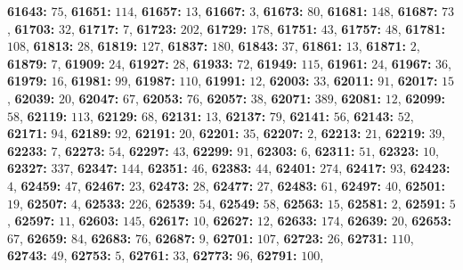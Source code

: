 \textsf{\bfseries 61643:} $75$, \textsf{\bfseries 61651:} $114$, \textsf{\bfseries 61657:} $13$, \textsf{\bfseries 61667:} $3$, \textsf{\bfseries 61673:} $80$, \textsf{\bfseries 61681:} $148$, \textsf{\bfseries 61687:} $73$, \textsf{\bfseries 61703:} $32$, \textsf{\bfseries 61717:} $7$, \textsf{\bfseries 61723:} $202$, \textsf{\bfseries 61729:} $178$, \textsf{\bfseries 61751:} $43$, \textsf{\bfseries 61757:} $48$, \textsf{\bfseries 61781:} $108$, \textsf{\bfseries 61813:} $28$, \textsf{\bfseries 61819:} $127$, \textsf{\bfseries 61837:} $180$, \textsf{\bfseries 61843:} $37$, \textsf{\bfseries 61861:} $13$, \textsf{\bfseries 61871:} $2$, \textsf{\bfseries 61879:} $7$, \textsf{\bfseries 61909:} $24$, \textsf{\bfseries 61927:} $28$, \textsf{\bfseries 61933:} $72$, \textsf{\bfseries 61949:} $115$, \textsf{\bfseries 61961:} $24$, \textsf{\bfseries 61967:} $36$, \textsf{\bfseries 61979:} $16$, \textsf{\bfseries 61981:} $99$, \textsf{\bfseries 61987:} $110$, \textsf{\bfseries 61991:} $12$, \textsf{\bfseries 62003:} $33$, \textsf{\bfseries 62011:} $91$, \textsf{\bfseries 62017:} $15$, \textsf{\bfseries 62039:} $20$, \textsf{\bfseries 62047:} $67$, \textsf{\bfseries 62053:} $76$, \textsf{\bfseries 62057:} $38$, \textsf{\bfseries 62071:} $389$, \textsf{\bfseries 62081:} $12$, \textsf{\bfseries 62099:} $58$, \textsf{\bfseries 62119:} $113$, \textsf{\bfseries 62129:} $68$, \textsf{\bfseries 62131:} $13$, \textsf{\bfseries 62137:} $79$, \textsf{\bfseries 62141:} $56$, \textsf{\bfseries 62143:} $52$, \textsf{\bfseries 62171:} $94$, \textsf{\bfseries 62189:} $92$, \textsf{\bfseries 62191:} $20$, \textsf{\bfseries 62201:} $35$, \textsf{\bfseries 62207:} $2$, \textsf{\bfseries 62213:} $21$, \textsf{\bfseries 62219:} $39$, \textsf{\bfseries 62233:} $7$, \textsf{\bfseries 62273:} $54$, \textsf{\bfseries 62297:} $43$, \textsf{\bfseries 62299:} $91$, \textsf{\bfseries 62303:} $6$, \textsf{\bfseries 62311:} $51$, \textsf{\bfseries 62323:} $10$, \textsf{\bfseries 62327:} $337$, \textsf{\bfseries 62347:} $144$, \textsf{\bfseries 62351:} $46$, \textsf{\bfseries 62383:} $44$, \textsf{\bfseries 62401:} $274$, \textsf{\bfseries 62417:} $93$, \textsf{\bfseries 62423:} $4$, \textsf{\bfseries 62459:} $47$, \textsf{\bfseries 62467:} $23$, \textsf{\bfseries 62473:} $28$, \textsf{\bfseries 62477:} $27$, \textsf{\bfseries 62483:} $61$, \textsf{\bfseries 62497:} $40$, \textsf{\bfseries 62501:} $19$, \textsf{\bfseries 62507:} $4$, \textsf{\bfseries 62533:} $226$, \textsf{\bfseries 62539:} $54$, \textsf{\bfseries 62549:} $58$, \textsf{\bfseries 62563:} $15$, \textsf{\bfseries 62581:} $2$, \textsf{\bfseries 62591:} $5$, \textsf{\bfseries 62597:} $11$, \textsf{\bfseries 62603:} $145$, \textsf{\bfseries 62617:} $10$, \textsf{\bfseries 62627:} $12$, \textsf{\bfseries 62633:} $174$, \textsf{\bfseries 62639:} $20$, \textsf{\bfseries 62653:} $67$, \textsf{\bfseries 62659:} $84$, \textsf{\bfseries 62683:} $76$, \textsf{\bfseries 62687:} $9$, \textsf{\bfseries 62701:} $107$, \textsf{\bfseries 62723:} $26$, \textsf{\bfseries 62731:} $110$, \textsf{\bfseries 62743:} $49$, \textsf{\bfseries 62753:} $5$, \textsf{\bfseries 62761:} $33$, \textsf{\bfseries 62773:} $96$, \textsf{\bfseries 62791:} $100$, 
